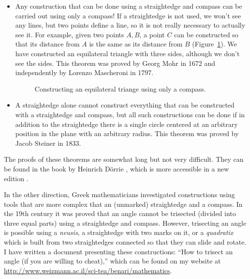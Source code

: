 \begin{itemize}
\item Any construction that can be done using a straightedge and compass can be carried out using only a compass! If a straightedge is not used, we won't see any lines, but two points define a line, so it is not really necessary to actually see it. For example, given two points $A,B$, a point $C$ can be constructed so that its distance from $A$ is the same as its distance from $B$ (Figure~\ref{fig.mm}). We have constructed an equilateral triangle with three sides, although we don't see the sides.  This theorem was proved by Georg Mohr in 1672 and independently by Lorenzo Mascheroni in 1797.
\begin{figure}[H]
\begin{center}
\caption{Constructing an equilateral triange using only a compass.}\label{fig.mm}
\end{center}
\end{figure}
\vspace*{-4ex}
\item  A straightedge alone cannot construct everything that can be constructed with a straightedge and compass, but all such constructions can be done if in addition to the straightedge there is a single circle centered at an arbitrary position in the plane with an arbitrary radius. This theorem was proved by Jacob Steiner in 1833.
\end{itemize}
The proofs of these theorems are somewhat long but not very difficult. They can be found in the book by Heinrich D\"{o}rrie \cite{dorrie1}, which is more accessible in a new edition \cite{dorrie2}.

In the other direction, Greek mathematicians investigated constructions using tools that are more complex that an (unmarked) straightedge and a compass. In the 19th century it was proved that an angle cannot be trisected (divided into three equal parts) using a straightedge and compass. However, trisecting an angle is possible using a \emph{neusis}, a straightedge with two marks on it, or a \emph{quadratix} which is built from two straightedges connected so that they can slide and rotate. I have written a document presenting these constructions: ``How to trisect an angle (if you are willing to cheat),'' which can be found on my website at \url{http://www.weizmann.ac.il/sci-tea/benari/mathematics}.


